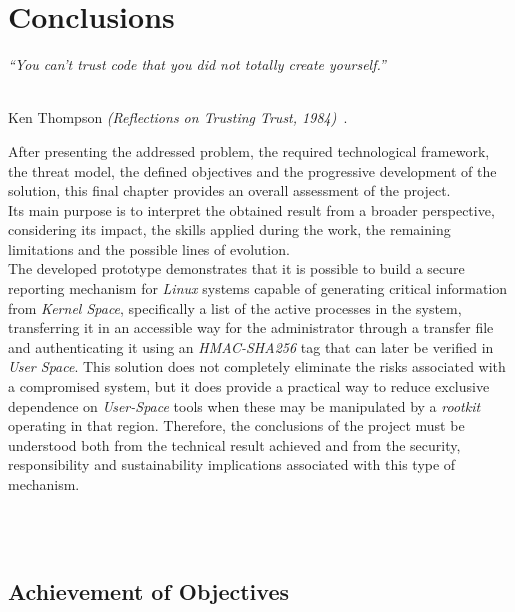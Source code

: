 \chapter{Conclusions}
\label{cap:capitulo6}

\begin{flushright}
\begin{minipage}[]{10cm}
\emph{``You can't trust code that you did not totally create yourself.''}\\
\end{minipage}\\

Ken Thompson \textit{(Reflections on Trusting Trust, 1984)}~\cite{thompson_trusting_trust}.
\end{flushright}

\vspace{1cm}

After presenting the addressed problem, the required technological framework, the threat model, the defined objectives and the progressive development of the solution, this final chapter provides an overall assessment of the project.\\

Its main purpose is to interpret the obtained result from a broader perspective, considering its impact, the skills applied during the work, the remaining limitations and the possible lines of evolution.\\

The developed prototype demonstrates that it is possible to build a secure reporting mechanism for \textit{Linux} systems capable of generating critical information from \textit{Kernel Space}, specifically a list of the active processes in the system, transferring it in an accessible way for the administrator through a transfer file and authenticating it using an \textit{HMAC-SHA256} tag that can later be verified in \textit{User Space}.
This solution does not completely eliminate the risks associated with a compromised system, but it does provide a practical way to reduce exclusive dependence on \textit{User-Space} tools when these may be manipulated by a \textit{rootkit} operating in that region.
Therefore, the conclusions of the project must be understood both from the technical result achieved and from the security, responsibility and sustainability implications associated with this type of mechanism.\\

\

\

\section{Achievement of Objectives}

